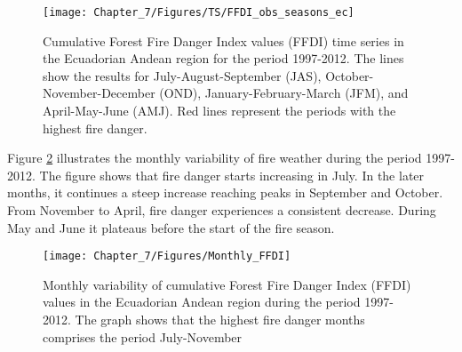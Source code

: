 \begin{figure}[h]
\noindent \begin{centering}
\texttt{[image: Chapter\_7/Figures/TS/FFDI\_obs\_seasons\_ec]}
\par\end{centering}

\caption[Cumulative Forest Fire Danger Index values (FFDI) time series in the
Ecuadorian Andean region for the period 1997-2012]{Cumulative Forest Fire Danger Index values (FFDI) time series in the
Ecuadorian Andean region for the period 1997-2012. The lines show
the results for July-August-September (JAS), October-November-December
(OND), January-February-March (JFM), and April-May-June (AMJ). Red
lines represent the periods with the highest fire danger. \label{fig:Cumulative Forest Fire Danger Index values (FFDI) time series in the Ecuadorian andean region for the period 1997-2012}}
\end{figure}


Figure \ref{fig:Monthly variability of cumulative Forest Fire Danger Index (FFDI) values in the Ecuadorian andean region during the period 1997-2012}
illustrates the monthly variability of fire weather during the period
1997-2012. The figure shows that fire danger starts increasing in
July. In the later months, it continues a steep increase reaching
peaks in September and October. From November to April, fire danger
experiences a consistent decrease. During May and June it plateaus
before the start of the fire season. 

\begin{figure}[h]
\noindent \begin{centering}
\texttt{[image: Chapter\_7/Figures/Monthly\_FFDI]}
\par\end{centering}

\caption[Monthly variability of cumulative Forest Fire Danger Index (FFDI)
values in the Ecuadorian Andean region during the period 1997-2012]{Monthly variability of cumulative Forest Fire Danger Index (FFDI)
values in the Ecuadorian Andean region during the period 1997-2012.
The graph shows that the highest fire danger months comprises the
period July-November \label{fig:Monthly variability of cumulative Forest Fire Danger Index (FFDI) values in the Ecuadorian andean region during the period 1997-2012} }
\end{figure}


